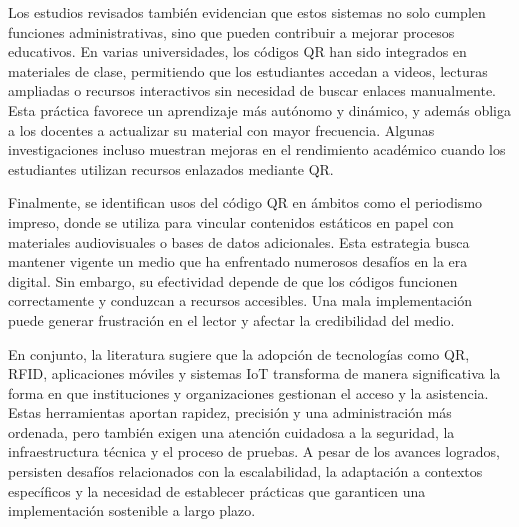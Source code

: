 Los estudios revisados también evidencian que estos sistemas no solo cumplen funciones administrativas, sino que pueden contribuir a mejorar procesos educativos. En varias universidades, los códigos QR han sido integrados en materiales de clase, permitiendo que los estudiantes accedan a videos, lecturas ampliadas o recursos interactivos sin necesidad de buscar enlaces manualmente. Esta práctica favorece un aprendizaje más autónomo y dinámico, y además obliga a los docentes a actualizar su material con mayor frecuencia. Algunas investigaciones incluso muestran mejoras en el rendimiento académico cuando los estudiantes utilizan recursos enlazados mediante QR.

Finalmente, se identifican usos del código QR en ámbitos como el periodismo impreso, donde se utiliza para vincular contenidos estáticos en papel con materiales audiovisuales o bases de datos adicionales. Esta estrategia busca mantener vigente un medio que ha enfrentado numerosos desafíos en la era digital. Sin embargo, su efectividad depende de que los códigos funcionen correctamente y conduzcan a recursos accesibles. Una mala implementación puede generar frustración en el lector y afectar la credibilidad del medio.

En conjunto, la literatura sugiere que la adopción de tecnologías como QR, RFID, aplicaciones móviles y sistemas IoT transforma de manera significativa la forma en que instituciones y organizaciones gestionan el acceso y la asistencia. Estas herramientas aportan rapidez, precisión y una administración más ordenada, pero también exigen una atención cuidadosa a la seguridad, la infraestructura técnica y el proceso de pruebas. A pesar de los avances logrados, persisten desafíos relacionados con la escalabilidad, la adaptación a contextos específicos y la necesidad de establecer prácticas que garanticen una implementación sostenible a largo plazo.
